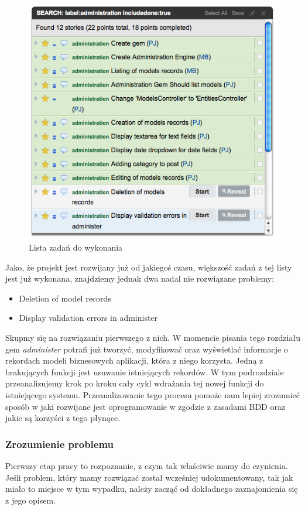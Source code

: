     \begin{figure}
  		\begin{center}
  			\includegraphics[width=0.8\linewidth]{images/administer_stories_list.png}
  			\caption{Lista zadań do wykonania}
  			\label{administer_stories}
  		\end{center}
  	\end{figure}
  	
    Jako, że projekt jest rozwijany już od jakiegoś czasu, większość zadań z tej listy jest już wykonana, znajdziemy jednak dwa nadal nie rozwiązane problemy:
    
    \begin{itemize}
      \item Deletion of model records
      \item Display validation errors in administer
    \end{itemize}
    
    Skupmy się na rozwiązaniu pierwszego z nich. W momencie pisania tego rozdziału gem \emph{administer} potrafi już tworzyć, modyfikować oraz wyświetlać informacje o rekordach modeli biznesowych aplikacji, która z niego korzysta. Jedną z brakujących funkcji jest usuwanie istniejących rekordów. W tym podrozdziale przeanalizujemy krok po kroku cały cykl wdrażania tej nowej funkcji do istniejącego systemu. Przeanalizowanie tego procesu pomoże nam lepiej zrozumieć sposób w jaki rozwijane jest oprogramowanie w zgodzie z zasadami BDD oraz jakie są korzyści z tego płynące.
    
    \subsubsection{Zrozumienie problemu}
    Pierwszy etap pracy to rozpoznanie, z czym tak właściwie mamy do czynienia. Jeśli problem, który mamy rozwiązać został wcześniej udokumentowany, tak jak miało to miejsce w tym wypadku, należy zacząć od dokładnego zaznajomienia się z jego opisem.
    
